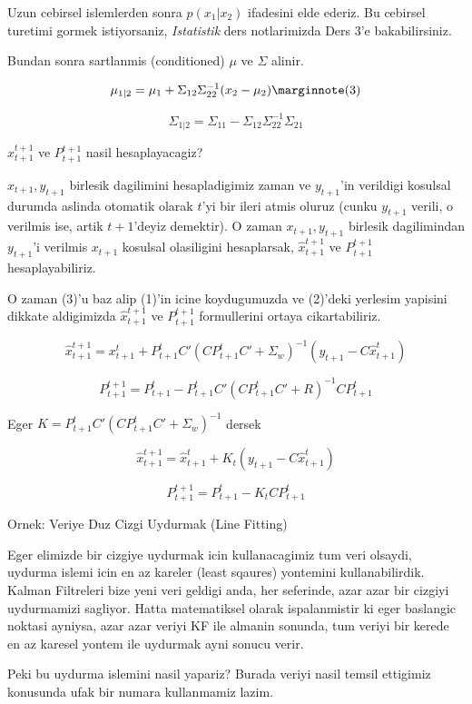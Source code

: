 \documentclass[12pt,fleqn]{article}\usepackage{../common}
\begin{document}
Uzun cebirsel islemlerden sonra $p(x_1|x_2)$ ifadesini elde ederiz. Bu
cebirsel turetimi gormek istiyorsaniz, {\em Istatistik} ders notlarimizda
Ders 3'e bakabilirsiniz.

Bundan sonra sartlanmis (conditioned) $\mu$ ve $\Sigma$ alinir.

\[ 
\mu_{1|2} = \mu_1 + \Sigma_{12}\Sigma_{22}^{-1}(x_2 - \mu_2) 
\mlabel{3}
\]

\[ \Sigma_{1|2} = \Sigma_{11}- \Sigma_{12}\Sigma_{22}^{-1}\Sigma_{21} \]

$\hat{x}_{t+1}^{t+1}$ ve $P_{t+1}^{t+1}$ nasil hesaplayacagiz? 

$x_{t+1} , y_{t+1}$ birlesik dagilimini hesapladigimiz zaman ve
$y_{t+1}$'in verildigi kosulsal durumda aslinda otomatik olarak $t$'yi bir
ileri atmis oluruz (cunku $y_{t+1}$ verili, o verilmis ise, artik
$t+1$'deyiz demektir). O zaman $x_{t+1} , y_{t+1}$ birlesik dagilimindan
$y_{t+1}$'i verilmis $x_{t+1}$ kosulsal olasiligini hesaplarsak,
$\hat{x}_{t+1}^{t+1}$ ve $P_{t+1}^{t+1}$ hesaplayabiliriz.


O zaman (3)'u baz alip (1)'in icine koydugumuzda ve (2)'deki
yerlesim yapisini dikkate aldigimizda $\hat{x}_{t+1}^{t+1}$ ve
$P_{t+1}^{t+1}$ formullerini ortaya cikartabiliriz.

\[ \hat{x}_{t+1}^{t+1} =  x_{t+1}^{t} +  P_{t+1}^{t}C'(CP_{t+1}^{t}C' + \Sigma_w)^{-1}
(y_{t+1}- C\hat{x}_{t+1}^t)
\]

\[ P_{t+1}^{t+1} = P_{t+1}^{t} - P_{t+1}^{t} C'(CP_{t+1}^{t} C'+R)^{-1}CP_{t+1}^{t} 
\]

Eger $K = P_{t+1}^{t}C'(CP_{t+1}^{t}C' + \Sigma_w)^{-1}$ dersek

\[  \hat{x}_{t+1}^{t+1}  =  \hat{x}_{t+1}^{t} + K_t (y_{t+1} - C \hat{x}_{t+1}^{t})  \]

\[  P_{t+1}^{t+1} =  P_{t+1}^{t} - K_tC P_{t+1}^{t} \]

Ornek: Veriye Duz Cizgi Uydurmak (Line Fitting)

Eger elimizde bir cizgiye uydurmak icin kullanacagimiz tum veri olsaydi,
uydurma islemi icin en az kareler (least sqaures) yontemini
kullanabilirdik.  Kalman Filtreleri bize yeni veri geldigi anda, her
seferinde, azar azar bir cizgiyi uydurmamizi sagliyor. Hatta matematiksel
olarak ispalanmistir ki eger baslangic noktasi ayniysa, azar azar veriyi KF
ile almanin sonunda, tum veriyi bir kerede en az karesel yontem ile
uydurmak ayni sonucu verir.

Peki bu uydurma islemini nasil yapariz? Burada veriyi nasil temsil ettigimiz
konusunda ufak bir numara kullanmamiz lazim.
\end{document}
